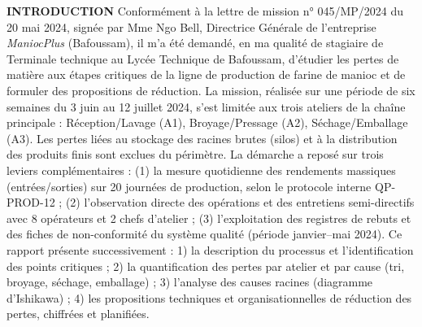 \documentclass[11pt]{article}
\begin{document}
\begin{exoresolu}
\textbf{INTRODUCTION}
Conformément à la lettre de mission n° 045/MP/2024 du 20 mai 2024, signée par Mme Ngo Bell, Directrice Générale de l'entreprise \emph{ManiocPlus} (Bafoussam), il m'a été demandé, en ma qualité de stagiaire de Terminale technique au Lycée Technique de Bafoussam, d'étudier les pertes de matière aux étapes critiques de la ligne de production de farine de manioc et de formuler des propositions de réduction.
La mission, réalisée sur une période de six semaines du 3 juin au 12 juillet 2024, s'est limitée aux trois ateliers de la chaîne principale : Réception/Lavage (A1), Broyage/Pressage (A2), Séchage/Emballage (A3). Les pertes liées au stockage des racines brutes (silos) et à la distribution des produits finis sont exclues du périmètre.
La démarche a reposé sur trois leviers complémentaires : (1) la mesure quotidienne des rendements massiques (entrées/sorties) sur 20 journées de production, selon le protocole interne QP-PROD-12 ; (2) l'observation directe des opérations et des entretiens semi-directifs avec 8 opérateurs et 2 chefs d'atelier ; (3) l'exploitation des registres de rebuts et des fiches de non-conformité du système qualité (période janvier--mai 2024).
Ce rapport présente successivement : 1) la description du processus et l'identification des points critiques ; 2) la quantification des pertes par atelier et par cause (tri, broyage, séchage, emballage) ; 3) l'analyse des causes racines (diagramme d'Ishikawa) ; 4) les propositions techniques et organisationnelles de réduction des pertes, chiffrées et planifiées.


\end{exoresolu}
\end{document}
